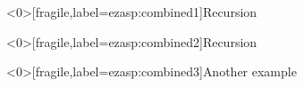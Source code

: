 
\begin{frame}<0>[fragile,label=ezasp:combined1]{Recursion}

\end{frame}
%

\begin{frame}<0>[fragile,label=ezasp:combined2]{Recursion}

\end{frame}
%

\begin{frame}<0>[fragile,label=ezasp:combined3]{Another example}

\end{frame}
%



%
%
